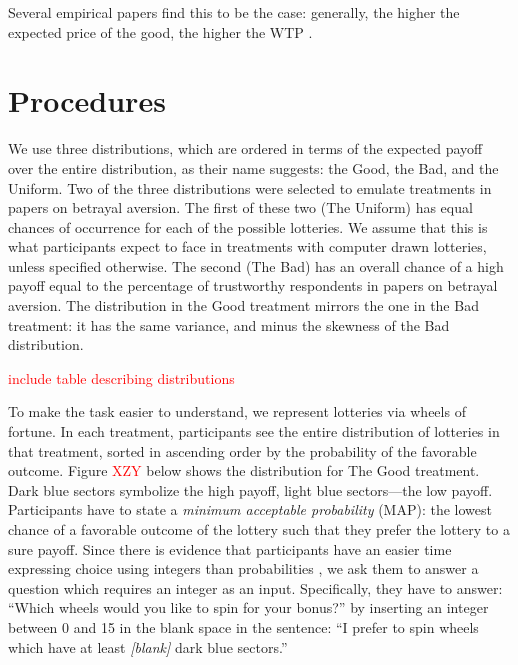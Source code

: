 Several empirical papers find this to be the case: generally, the higher the expected price of the good, the higher the WTP \citep[for a short review of this literature, see]{Tymula2016}.



\section{Procedures}\label{sec:proced}
We use three distributions, which are ordered in terms of the expected payoff over the entire distribution, as their name suggests: the Good, the Bad, and the Uniform.
Two of the three distributions were selected to emulate treatments in papers on betrayal aversion.
The first of these two (The Uniform) has equal chances of occurrence for each of the possible lotteries.
We assume that this is what participants expect to face in treatments with computer drawn lotteries, unless specified otherwise.
The second (The Bad) has an overall chance of a high payoff equal to the percentage of trustworthy respondents in papers on betrayal aversion.
The distribution in the Good treatment mirrors the one in the Bad treatment: it has the same variance, and minus the skewness of the Bad distribution.

\textcolor{red}{include table describing distributions}

To make the task easier to understand, we represent lotteries via wheels of fortune.
In each treatment, participants see the entire distribution of lotteries in that treatment, sorted in ascending order by the probability of the favorable outcome.
Figure \textcolor{red}{XZY} below shows the distribution for The Good treatment.
Dark blue sectors symbolize the high payoff, light blue sectors---the low payoff.
Participants have to state a \textit{minimum acceptable probability} (MAP): the lowest chance of a favorable outcome of the lottery such that they prefer the lottery to a sure payoff.
Since there is evidence that participants have an easier time expressing choice using integers than probabilities \citep{Quercia2016}, we ask them to answer a question which requires an integer as an input.
Specifically, they have to answer: ``Which wheels would you like to spin for your bonus?'' by inserting an integer between 0 and 15 in the blank space in the sentence: ``I prefer to spin wheels which have at least \textit{[blank]} dark blue sectors.''

